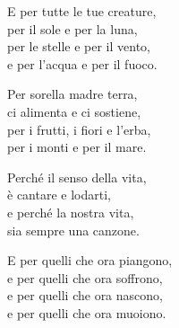 
 

\spazio

\strofa E per tutte le tue creature,\\
per il sole e per la luna,\\
per le stelle e per il vento,\\
e per l'acqua e per il fuoco.

\spazio

 

\spazio

\strofa Per sorella madre terra,\\
ci alimenta e ci sostiene,\\
per i frutti, i fiori e l'erba,\\
per i monti e per il mare.

\spazio

 

\spazio

\strofa Perché il senso della vita,\\
è cantare e lodarti,\\
e perché la nostra vita,\\
sia sempre una canzone.

\spazio

 

\spazio

\strofa E per quelli che ora piangono,\\
e per quelli che ora soffrono,\\
e per quelli che ora nascono,\\
e per quelli che ora muoiono.

\spazio

 